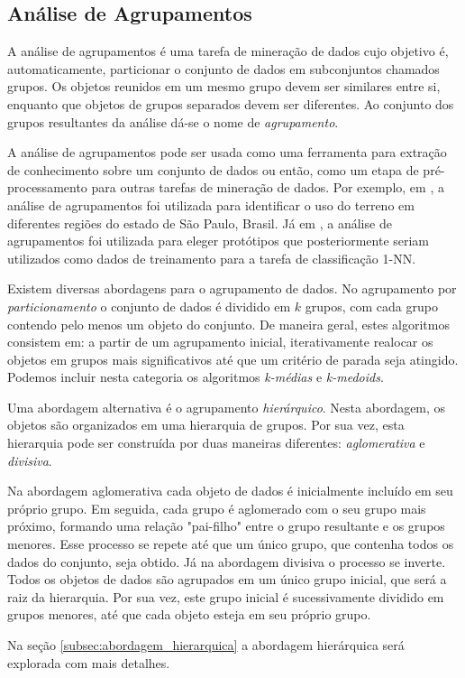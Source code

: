 \subsection{Análise de Agrupamentos}
	\label{subsec:analise_agrupamentos}
	
A análise de agrupamentos é uma tarefa de mineração de dados cujo objetivo é,
automaticamente, particionar o conjunto de dados em subconjuntos chamados
grupos. Os objetos reunidos em um mesmo grupo devem ser similares entre si,
enquanto que objetos de grupos separados devem ser diferentes. Ao conjunto dos
grupos resultantes da análise dá-se o nome de \emph{agrupamento}.

A análise de agrupamentos pode ser usada como uma ferramenta para extração de
conhecimento sobre um conjunto de dados ou então, como um etapa de
pré-processamento para outras tarefas de mineração de dados. Por exemplo, em
\cite{gonccalves2014land}, a análise de agrupamentos foi utilizada para
identificar o uso do terreno em diferentes regiões do estado de São Paulo,
Brasil. Já em \cite{petitjean2014dynamic}, a análise de agrupamentos foi
utilizada para eleger protótipos que posteriormente seriam utilizados como dados
de treinamento para a tarefa de classificação 1-NN.

Existem diversas abordagens para o agrupamento de dados. No agrupamento por
\emph{particionamento} o conjunto de dados é dividido em $k$ grupos, com cada 
grupo contendo pelo menos um objeto do conjunto. De maneira geral, estes
algoritmos consistem em: a partir de um agrupamento inicial, iterativamente 
realocar os objetos em grupos mais significativos até que um critério de parada
seja atingido. Podemos incluir nesta categoria os algoritmos \emph{k-médias} e
\emph{k-medoids}.

Uma abordagem alternativa é o agrupamento \emph{hierárquico}. Nesta abordagem, 
os objetos são organizados em uma hierarquia de grupos. Por sua vez, esta
hierarquia pode ser construída por duas maneiras diferentes:
\emph{aglomerativa} e \emph{divisiva}.

Na abordagem aglomerativa cada objeto de dados é inicialmente incluído em seu
próprio grupo. Em seguida, cada grupo é aglomerado com o seu grupo mais próximo,
formando uma relação "pai-filho" entre o grupo resultante e os grupos menores.
Esse processo se repete até que um único grupo, que contenha todos os dados do 
conjunto, seja obtido. Já na abordagem divisiva o processo se inverte. Todos os
objetos de dados são agrupados em um único grupo inicial, que será a raiz da 
hierarquia. Por sua vez, este grupo inicial é sucessivamente dividido em grupos
menores, até que cada objeto esteja em seu próprio grupo.

Na seção \ref{subsec:abordagem_hierarquica} a abordagem hierárquica será
explorada com mais detalhes.